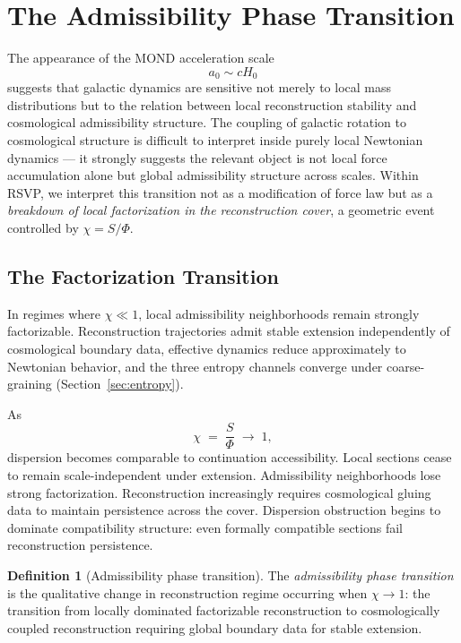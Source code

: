 \documentclass[11pt, a4paper]{article}
\theoremstyle{plain}
\theoremstyle{definition}
\newtheorem{definition}[theorem]{Definition}
\theoremstyle{remark}
\begin{document}
\section{The Admissibility Phase Transition}
\label{sec:transition}

The appearance of the MOND acceleration scale \cite{milgrom1983,mcgaugh2011}
\begin{equation}
  a_0 \sim cH_0
\end{equation}
suggests that galactic dynamics are sensitive not merely to local mass distributions
but to the relation between local reconstruction stability and cosmological
admissibility structure. The coupling of galactic rotation to cosmological structure
is difficult to interpret inside purely local Newtonian dynamics --- it strongly
suggests the relevant object is not local force accumulation alone but global
admissibility structure across scales. Within RSVP, we interpret this transition not
as a modification of force law but as a \emph{breakdown of local factorization in the
reconstruction cover}, a geometric event controlled by $\chi = S/\Phi$.

\subsection{The Factorization Transition}

In regimes where $\chi \ll 1$, local admissibility neighborhoods remain strongly
factorizable. Reconstruction trajectories admit stable extension independently of
cosmological boundary data, effective dynamics reduce approximately to Newtonian
behavior, and the three entropy channels converge under coarse-graining
(Section~\ref{sec:entropy}).

As
\begin{equation}
  \chi \;=\; \frac{S}{\Phi} \;\longrightarrow\; 1,
\end{equation}
dispersion becomes comparable to continuation accessibility. Local sections cease to
remain scale-independent under extension. Admissibility neighborhoods lose strong
factorization. Reconstruction increasingly requires cosmological gluing data to
maintain persistence across the cover. Dispersion obstruction begins to dominate
compatibility structure: even formally compatible sections fail reconstruction
persistence.

\begin{definition}[Admissibility phase transition]
\label{def:phase-trans}
The \emph{admissibility phase transition} is the qualitative change in reconstruction
regime occurring when $\chi \to 1$: the transition from locally dominated
factorizable reconstruction to cosmologically coupled reconstruction requiring global
boundary data for stable extension.
\end{definition}
\end{document}
